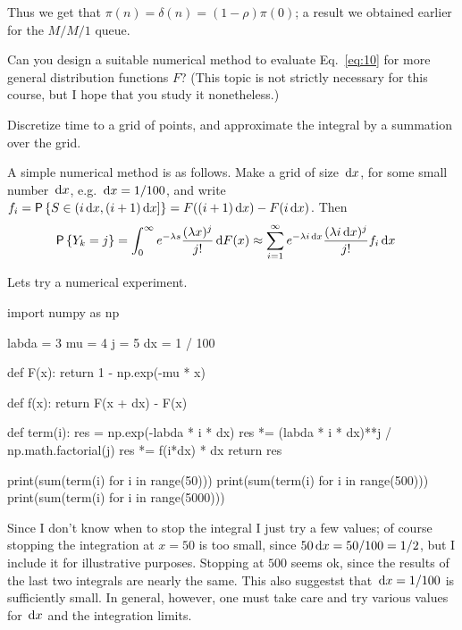 \begin{exercise}
\begin{solution}
Thus we get that $\pi(n) = \delta(n) = (1-\rho) \pi(0)$; a result we
obtained earlier for the $M/M/1$ queue.
\end{solution}
\end{exercise}


\begin{exercise}
  Can you design a suitable numerical method to evaluate   Eq.~\eqref{eq:10} for more 
  general distribution functions $F$? (This topic is not strictly necessary for this course, but I hope that you study it nonetheless.)
\begin{hint}
Discretize time to  a grid of points, and   approximate the integral by a summation over the grid.
\end{hint}
  \begin{solution}
  A simple numerical method is as follows. Make a grid of
  size $\,\text{d}x$, for some small number $\,\text{d}x$, e.g. $\,\text{d}x=1/100$, and write
  $f_i = \P{S\in(i\d x, (i+1)\d x]} = F((i+1)\d x) - F(i\d x)$. Then 
  \begin{equation*}
    \begin{split}
  \P{Y_k = j} 
&= \int_0^\infty e^{-\lambda s}\frac{(\lambda x)^j}{j!} \d F(x) 
\approx \sum_{i=1}^\infty e^{-\lambda i \d x}\frac{(\lambda i\d x)^j}{j!} f_i \d x
    \end{split}
\end{equation*}

Lets try a numerical experiment. 

\begin{pyconsole}
import numpy as np

labda = 3
mu = 4
j = 5
dx = 1 / 100


def F(x):
    return 1 - np.exp(-mu * x)


def f(x):
    return F(x + dx) - F(x)


def term(i):
    res = np.exp(-labda * i * dx)
    res *= (labda * i * dx)**j / np.math.factorial(j)
    res *= f(i*dx) * dx
    return res

\end{pyconsole}

\begin{pyconsole}
print(sum(term(i) for i in range(50)))
print(sum(term(i) for i in range(500)))
print(sum(term(i) for i in range(5000)))
\end{pyconsole}

Since I don't know when to stop the integral I just try a few values;
of course stopping the integration at $x=50$ is too small, since
$50\,\text{d}x=50/100=1/2$, but I include it for illustrative
purposes. Stopping at $500$ seems ok, since the results of the last
two integrals are nearly the same. This also suggestst that
$\,\text{d}x=1/100$ is sufficiently small. In general, however, one must take
care and try various values for $\,\text{d}x$ and the integration limits.



\end{solution}
\end{exercise}
